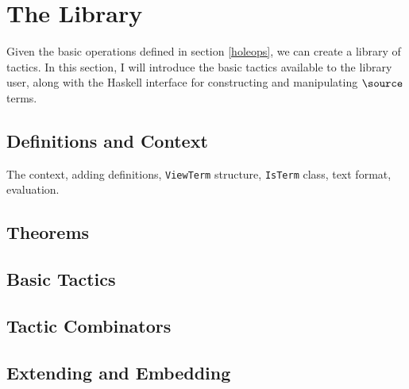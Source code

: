 \section{The \Ivor{} Library}

Given the basic operations defined in section \ref{holeops}, we can
create a library of tactics. In this section, I will introduce the
basic tactics available to the library user, along with the Haskell
interface for constructing and manipulating $\source$ terms.

\subsection{Definitions and Context}

The context, adding definitions, \texttt{ViewTerm} structure,
\texttt{IsTerm} class, text format, evaluation.

\subsection{Theorems}

\subsection{Basic Tactics}

\subsection{Tactic Combinators}

\subsection{Extending and Embedding}